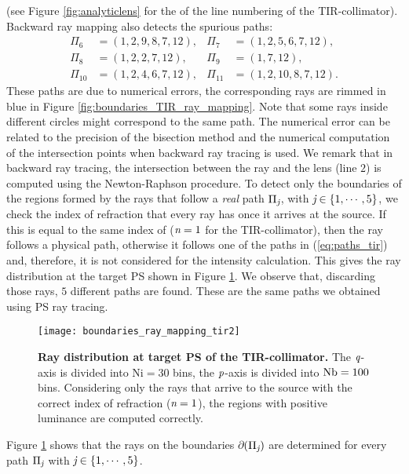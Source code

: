 (see Figure \ref{fig:analyticlens} for the of the line numbering of the TIR-collimator). 
Backward ray mapping also detects the spurious paths:
\begin{equation}\label{eq:paths_tir}
\begin{array}{llll}
\Pi_6&=(1,2,9,8,7,12), & \Pi_7&=(1,2,5,6,7,12), \\
\Pi_8&=(1,2,2,7,12),& \Pi_9&=(1,7,12),\\
\Pi_{10}&=(1,2,4,6,7,12),& \Pi_{11}&=(1,2,10,8,7,12).
\end{array}\end{equation}
These paths are due to numerical errors, the corresponding rays are rimmed in blue in Figure \ref{fig:boundaries_TIR_ray_mapping}. Note that some rays inside different circles might correspond to the same path. The numerical error can be related to the precision of the bisection method and the numerical computation of the intersection points when backward ray tracing is used. We remark that in backward ray tracing, the intersection between the ray and the lens (line $2$) is computed using the Newton-Raphson procedure.
To detect only the boundaries of the regions formed by the rays that follow a \textit{real} path $\Pi_{\textit{j}}$, with $\textit{j}\in\{1, \cdots, 5\}$, we check the index of refraction that every ray has once it arrives at the source.
If this is equal to the same index of  ($\textit{n}=1$ for the TIR-collimator), then the ray follows a physical path, otherwise it follows one of the paths in (\ref{eq:paths_tir}) and, therefore, it is not considered for the intensity calculation. This gives the ray distribution at the target PS shown in Figure \ref{fig:boundaries_TIR_ray_mapping1}. We observe that, discarding those rays, $5$ different paths are found. These are the same paths we obtained using PS ray tracing.
\begin{figure}[h]
  \begin{center}
  \texttt{[image: boundaries\_ray\_mapping\_tir2]}
  \end{center}
  \caption{\textbf{Ray distribution at target PS of the TIR-collimator.}
 The $\textit{q}$-axis is divided into $\textrm{Ni}=30$ bins, the $\textit{p}$-axis is divided into $\textrm{Nb} = 100$ bins. Considering only the rays that arrive to the source with the correct index of refraction ($\textit{n}=1$), the regions with positive luminance are computed correctly.}
\label{fig:boundaries_TIR_ray_mapping1}
 \end{figure}
Figure \ref{fig:boundaries_TIR_ray_mapping1} shows that the rays on the boundaries $\partial$$(\Pi_{\textit{j}})$ are determined for every path $\Pi_{\textit{j}}$ with $\textit{j}\in\{1, \cdots, 5\}$. 

